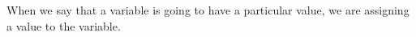 When we say that a variable is going to have a particular value,
we are assigning a value to the variable.
